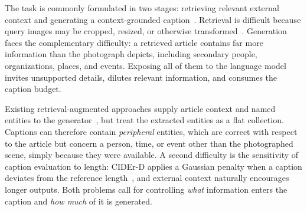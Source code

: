 \documentclass[runningheads]{llncs}
\DeclareRobustCommand{\aciids}[1]{{\color{olive}#1}}
\DeclareRobustCommand{\aciids}[1]{#1}
\begin{document}
The task is commonly formulated in two stages: retrieving relevant external context and generating a context-grounded caption~\cite{eventa_challenge}. Retrieval is difficult because query images may be cropped, resized, or otherwise transformed~\cite{nguyen2025openevents}. Generation faces the complementary difficulty: a retrieved article contains far more information than the photograph depicts, including secondary people, organizations, places, and events. Exposing all of them to the language model invites unsupported details, dilutes relevant information, and consumes the caption budget.

Existing retrieval-augmented approaches supply article context and named entities to the generator~\cite{enric,recap}, but treat the extracted entities as a flat collection. \aciids{Captions can therefore contain \emph{peripheral} entities, which are correct with respect to the article but concern a person, time, or event other than the photographed scene, simply because they were available.} A second difficulty is the sensitivity of caption evaluation to length: CIDEr-D applies a Gaussian penalty when a caption deviates from the reference length~\cite{vedantam2015cider}, and external context naturally encourages longer outputs. Both problems call for controlling \emph{what} information enters the caption and \emph{how much} of it is generated.
\end{document}
